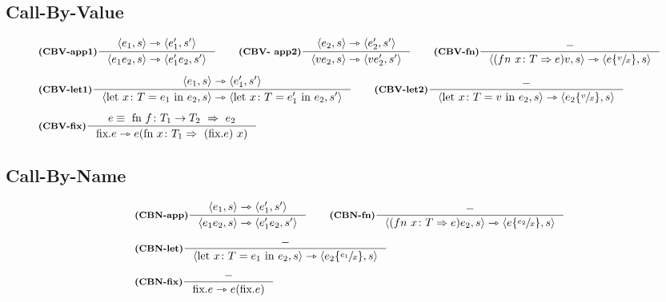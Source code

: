 \documentclass[a4paper, 10pt]{article}
\theoremstyle{definition}
\newcommand{\infer}[4]{\inference[\textbf{#1}]{#2}{#3}#4 }
\newcommand{\srule}[2]{\langle #1 \rangle \rightarrowtriangle \langle #2 \rangle}
\newcommand{\srulea}[2]{ #1  \rightarrowtriangle #2}
\newcommand{\letin}[2]{\text{let } #1 \text{ in } #2}
\newcommand{\subs}[3]{#1 \lbrace \sfrac{#2}{#3} \rbrace}
\begin{document}
\begin{minipage}{.45\linewidth}
\begin{flushleft}
\subsection*{Call-By-Value}
	\begin{align*}
		&\infer{(CBV-app1)}{\srule{e_1, s}{e_1', s'}}{\srule{e_1 e_2, s}{e_1'e_2, s'}}{} \qquad
		\infer{(CBV- app2)}{\srule{e_2, s}{e_2', s'}}{\srule{ve_2, s}{ve_2', s'}}{} \qquad
		\infer{(CBV-fn)}{-}{\srule{(fn\ x\colon T\Rightarrow e)v, s}{\subs{e}{v}{x}, s}}{} \\ \\
		&\infer{(CBV-let1)}{\srule{e_1,s}{e_1', s'}}{\srule{\letin{x\colon T = e_1}{e_2, s}}{\letin{x\colon T = e_1'}{e_2, s'}}}{} \qquad
		\infer{(CBV-let2)}{-}{\srule{\letin{x\colon T = v}{e_2, s}}{\subs{e_2}{v}{x}, s}}{} \\ \\
		&\infer{(CBV-fix)}{e\equiv\ \text{fn } f\colon T_1 \rightarrow T_2\ \Rightarrow\ e_2}{\srulea{\text{fix}.e}{e(\text{fn }x\colon T_1 \Rightarrow\ (\text{fix}.e)\ x)}}{}
	\end{align*}
\subsection*{Call-By-Name}
	\begin{align*}
		&\infer{(CBN-app)}{\srule{e_1, s}{e_1', s'}}{\srule{e_1e_2, s}{e_1'e_2, s'}}{} \qquad
		\infer{(CBN-fn)}{-}{\srule{(fn\ x\colon T\Rightarrow e)e_2, s}{\subs{e}{e_2}{x},s}}{} \\ \\
		&\infer{(CBN-let)}{-}{\srule{\letin{x\colon T = e_1}{e_2, s}}{\subs{e_2}{e_1}{x}, s}}{} \\ \\
		&\infer{(CBN-fix)}{-}{\srulea{\text{fix}.e}{e(\text{fix}.e)}}{}
	\end{align*}
	\end{flushleft}
\end{minipage}
	\newpage
	
\end{document}
